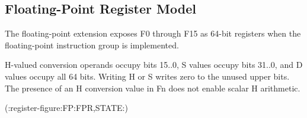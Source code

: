 \subsection{Floating-Point Register Model}\label{section:floating-point-register-model}
The floating-point extension exposes F0 through F15 as 64-bit registers when the floating-point
instruction group is implemented.

H-valued conversion operands occupy bits 15..0, S values occupy bits 31..0, and D values occupy all 64 bits.
Writing H or S writes zero to the unused upper bits. The presence of an H conversion value in Fn does not enable
scalar H arithmetic.

(:register-figure:FP:FPR,STATE:)
